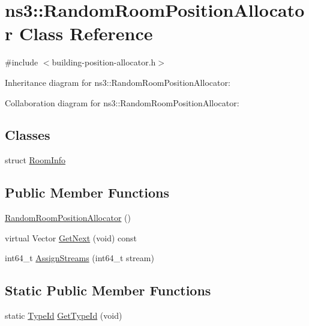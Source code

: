 \hypertarget{classns3_1_1RandomRoomPositionAllocator}{}\section{ns3\+:\+:Random\+Room\+Position\+Allocator Class Reference}
\label{classns3_1_1RandomRoomPositionAllocator}


{\ttfamily \#include $<$building-\/position-\/allocator.\+h$>$}



Inheritance diagram for ns3\+:\+:Random\+Room\+Position\+Allocator\+:


Collaboration diagram for ns3\+:\+:Random\+Room\+Position\+Allocator\+:
\subsection*{Classes}
\begin{DoxyCompactItemize}
\item 
struct \hyperlink{structns3_1_1RandomRoomPositionAllocator_1_1RoomInfo}{Room\+Info}
\end{DoxyCompactItemize}
\subsection*{Public Member Functions}
\begin{DoxyCompactItemize}
\item 
\hyperlink{classns3_1_1RandomRoomPositionAllocator_a2df2928eda0e620e67fd30da857af5ac}{Random\+Room\+Position\+Allocator} ()
\item 
virtual Vector \hyperlink{classns3_1_1RandomRoomPositionAllocator_a01f64780cc703025e55f1cc451e2441c}{Get\+Next} (void) const 
\item 
int64\+\_\+t \hyperlink{classns3_1_1RandomRoomPositionAllocator_a143ceb5be825ab1c35080497df64c2d1}{Assign\+Streams} (int64\+\_\+t stream)
\end{DoxyCompactItemize}
\subsection*{Static Public Member Functions}
\begin{DoxyCompactItemize}
\item 
static \hyperlink{classns3_1_1TypeId}{Type\+Id} \hyperlink{classns3_1_1RandomRoomPositionAllocator_acbf3b609e7cd7f8b632e03f75e0ba638}{Get\+Type\+Id} (void)
\end{DoxyCompactItemize}
